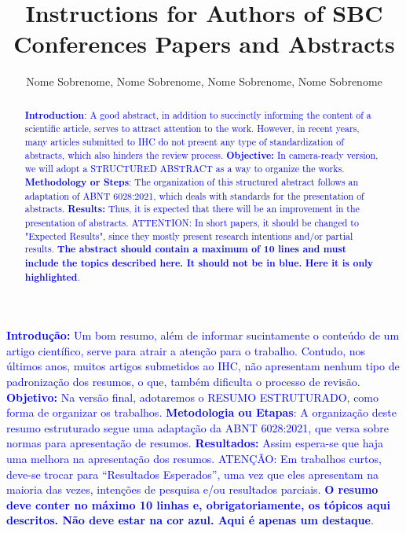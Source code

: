 \documentclass[12pt]{article}
\title{Instructions for Authors of SBC Conferences 
Papers and Abstracts} %
\author{Nome Sobrenome\inst{1}, Nome Sobrenome\inst{2}, Nome Sobrenome\inst{1}, Nome Sobrenome\inst{3} }
\begin{document}
 


\maketitle

\thispagestyle{plain}

\begin{abstract}\textcolor{blue}{
\textbf{Introduction}: A good abstract, in addition to succinctly informing the content of a scientific article, serves to attract attention to the work. However, in recent years, many articles submitted to IHC do not present any type of standardization of abstracts, which also hinders the review process.
\textbf{Objective:} In camera-ready version, we will adopt a  STRUCTURED ABSTRACT as a way to organize the works.
\textbf{Methodology or Steps}: The organization of this structured abstract follows an adaptation of ABNT 6028:2021, which deals with standards for the presentation of abstracts.
\textbf{Results:} Thus, it is expected that there will be an improvement in the presentation of abstracts. ATTENTION: In short papers, it should be changed to "Expected Results", since they mostly present research intentions and/or partial results. \textbf{The abstract should contain a maximum of 10 lines and must include the topics described here. It should not be in blue. Here it is only highlighted}.}
\end{abstract}

     

\begin{resumo} \textcolor{blue}{
  \textbf{Introdução:} Um bom resumo, além de informar sucintamente o conteúdo de um artigo científico, serve para atrair a atenção para o trabalho. Contudo, nos últimos anos, muitos artigos submetidos ao IHC, não apresentam nenhum tipo de padronização dos resumos, o que, também dificulta o processo de revisão. 
  \textbf{Objetivo:} Na versão final, adotaremos o RESUMO ESTRUTURADO, como forma de organizar os trabalhos. 
  \textbf{Metodologia ou Etapas}: A organização deste resumo estruturado segue uma adaptação da ABNT 6028:2021, que versa sobre normas para apresentação de resumos.
  \textbf{Resultados:} Assim espera-se que haja uma melhora na apresentação dos resumos. ATENÇÃO: Em trabalhos curtos, deve-se trocar para ``Resultados Esperados'', uma vez que eles apresentam na maioria das vezes, intenções de pesquisa e/ou resultados parciais. \textbf{O resumo deve conter no máximo 10 linhas e, obrigatoriamente, os tópicos aqui descritos. Não deve estar na cor azul. Aqui é apenas um destaque}.}
\end{resumo}
\end{document}
